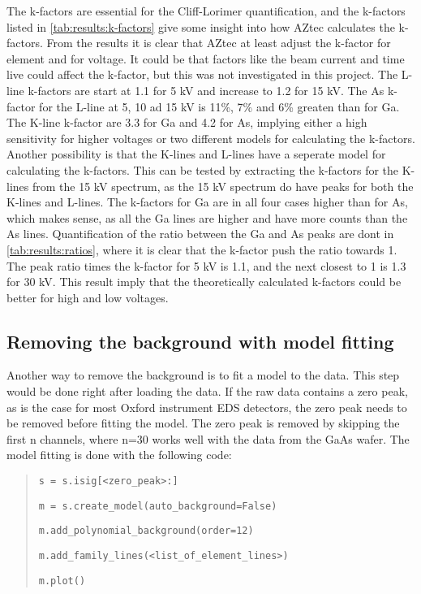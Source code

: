 The k-factors are essential for the Cliff-Lorimer quantification, and the k-factors listed in \cref{tab:results:k-factors} give some insight into how AZtec calculates the k-factors.
From the results it is clear that AZtec at least adjust the k-factor for element and for voltage.
It could be that factors like the beam current and time live could affect the k-factor, but this was not investigated in this project.
The L-line k-factors are start at 1.1 for 5 kV and increase to 1.2 for 15 kV.
The As k-factor for the L-line at 5, 10 ad 15 kV is 11\%, 7\% and 6\% greaten than for Ga.
The K-line k-factor are 3.3 for Ga and 4.2 for As, implying either a high sensitivity for higher voltages or two different models for calculating the k-factors.
Another possibility is that the K-lines and L-lines have a seperate model for calculating the k-factors.
This can be tested by extracting the k-factors for the K-lines from the 15 kV spectrum, as the 15 kV spectrum do have peaks for both the K-lines and L-lines.
The k-factors for Ga are in all four cases higher than for As, which makes sense, as all the Ga lines are higher and have more counts than the As lines.
Quantification of the ratio between the Ga and As peaks are dont in \cref{tab:results:ratios}, where it is clear that the k-factor push the ratio towards 1.
The peak ratio times the k-factor for 5 kV is 1.1, and the next closest to 1 is 1.3 for 30 kV.
This result imply that the theoretically calculated k-factors could be better for high and low voltages.





\subsection{Removing the background with model fitting}
\label{sec:discussion:steps:model_fitting}
Another way to remove the background is to fit a model to the data.
This step would be done right after loading the data.
If the raw data contains a zero peak, as is the case for most Oxford instrument EDS detectors, the zero peak needs to be removed before fitting the model.
The zero peak is removed by skipping the first n channels, where n=30 works well with the data from the GaAs wafer.
The model fitting is done with the following code:

\begin{quote}
    \verb|s = s.isig[<zero_peak>:]|

    \verb|m = s.create_model(auto_background=False)|

    \verb|m.add_polynomial_background(order=12)|

    \verb|m.add_family_lines(<list_of_element_lines>)|

    \verb|m.plot()|

\end{quote}


